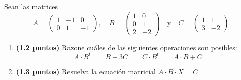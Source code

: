 
Sean las matrices
\[
A=\begin{pmatrix}1&-1&0\\0&1&-1\end{pmatrix},\quad
B=\begin{pmatrix}1&0\\0&1\\2&-2\end{pmatrix}\quad\text{y}\quad
C=\begin{pmatrix}1&1\\3&-2\end{pmatrix}.
\]
\begin{enumerate}[label=\alph*)]
\item \textbf{(1.2 puntos)} Razone cuáles de las siguientes operaciones son posibles:
\[
A\cdot B^t\qquad B+3C\qquad C\cdot B^t\qquad A\cdot B+C
\]
\item \textbf{(1.3 puntos)} Resuelva la ecuación matricial $A\cdot B\cdot X=C$
\end{enumerate}
